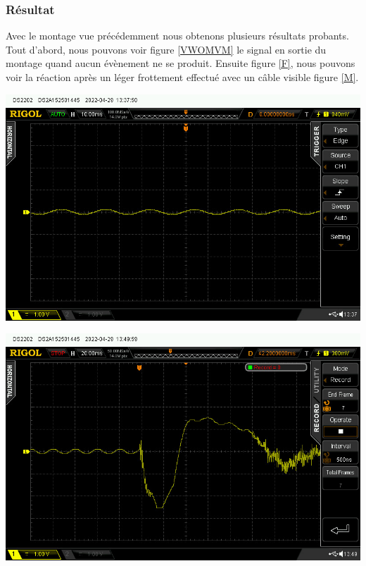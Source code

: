 \documentclass[11pt,french,a4paper]{article}
\begin{document}
\subsubsection{Résultat}
Avec le montage vue précédemment nous obtenons plusieurs résultats probants.
Tout d'abord, nous pouvons voir figure \ref{VWOMVM} le signal en sortie du montage quand aucun évènement ne se produit.
Ensuite figure \ref{F}, nous pouvons voir la réaction après un léger frottement effectué avec un câble visible figure \ref{M}. 

\begin{center}	
\includegraphics[scale=0.5]{../img/plat.jpg}
\label{VWOMVM}
\end{center}

\begin{center}	
\includegraphics[scale=0.5]{../img/frotment.jpg}
\label{F}
\end{center}
\end{document}
